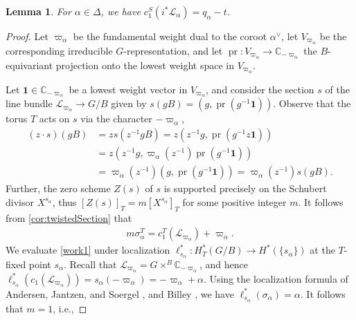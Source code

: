 \documentclass[10pt]{article}
\numberwithin{thm}{section}
\newtheorem{lemma}[thm]{Lemma}
\theoremstyle{definition}
\theoremstyle{remark}
\newcommand{\IC}{\mathbb C}
\DeclareMathOperator{\pr}{pr}
\begin{document}
\begin{lemma}
\label{qalpha}
For $\alpha\in\Delta$, we have $c_1^S(i^*\mathcal L_\alpha)=q_\alpha-t$.
\end{lemma}
\begin{proof}
Let $\varpi_\alpha$ be the fundamental weight dual to the coroot $\alpha^\vee$,
let $V_{\varpi_\alpha}$ be the corresponding irreducible $G$-representation,
and let $\pr:V_{\varpi_\alpha}\to\IC_{-\varpi_\alpha}$
the $B$-equivariant projection onto the lowest weight space in $V_{\varpi_\alpha}$. %

Let $\mathbf 1\in\IC_{-\varpi_\alpha}$ be a lowest weight vector in $V_{\varpi_\alpha}$,
and consider the section $s$
of the line bundle $\mathcal L_{\varpi_\alpha}\to G/B$
given by  $s(gB)= (g,\pr(g^{-1}\mathbf 1))$.
Observe that the torus $T$ acts on $s$ via the character $-\varpi_\alpha$,
\begin{align*}
(z\cdot s)(gB) & =zs(z^{-1}gB)  = z(z^{-1}g,\pr(g^{-1}z\mathbf 1))\\
               & =z(z^{-1}g,\varpi_\alpha(z^{-1})\pr(g^{-1}\mathbf 1))\\
               & =\varpi_\alpha(z^{-1}) (g,\pr(g^{-1}\mathbf 1)) =\varpi_\alpha(z^{-1})s(gB).
\end{align*}
Further, the zero scheme $Z(s)$ of $s$ is supported precisely on the Schubert divisor $X^{s_\alpha}$,
thus $[Z(s)]_T=m[X^{s_\alpha}]_T$ for some positive integer $m$.
It follows from \cref{cor:twistedSection} that
\begin{align}
\label{work1}
m\sigma^T_\alpha=c_1^T(\mathcal L_{\varpi_\alpha})+\varpi_\alpha.
\end{align}
We evaluate \cref{work1} under localization
$\ell_{s_\alpha}^*:H^*_T(G/B)\to H^*(\{s_\alpha\})$ at the $T$-fixed point $s_\alpha$.
Recall that $\mathcal L_{\varpi_\alpha}=G\times^B\IC_{-\varpi_\alpha}$,
and hence $\ell_{s_\alpha}^*(c_1(\mathcal L_{\varpi_\alpha}))=s_\alpha(-\varpi_\alpha)=-\varpi_\alpha+\alpha$. 
Using the localization formula of Andersen, Jantzen, and Soergel \cite{AJS}, and Billey \cite{billey:kostant},
we have $\ell_{s_\alpha}^*(\sigma_\alpha)=\alpha$.
It follows that $m=1$, i.e.,

\end{proof}
\end{document}
